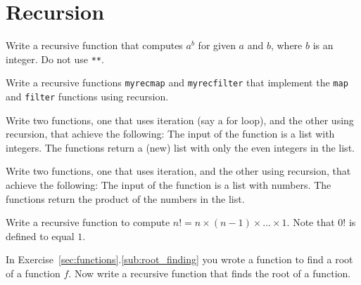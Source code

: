 \section{Recursion} %
\label{sec:recursion}

\begin{questions}
\label{sub:power}

Write a recursive function that computes $a^b$ for given $a$ and $b$, where
$b$ is an integer. Do not use \texttt{**}.


\label{sub:recursive_map}

Write a recursive functions \texttt{myrecmap} and \texttt{myrecfilter}
that implement the \texttt{map} and \texttt{filter} functions using recursion.


\label{sub:purify}

Write two functions, one that uses iteration (say a for loop), and the other using recursion, that achieve the following:
The input of the function is a list with integers. The functions return a (new) list with only the even integers in the list.

\label{sub:product}

Write two functions, one that uses iteration, and the other using recursion, that achieve the following:
The input of the function is a list with numbers. The functions return the product of the numbers in the list.


\label{sub:factorial}

Write a recursive function to compute $n! = n \times (n-1) \times \ldots \times 1$.
Note that $0!$ is defined to equal $1$.


\label{sub:rec_root_finding}

In Exercise~\ref{sec:functions}.\ref{sub:root_finding} you wrote a function to find a root of a function $f$.
Now write a recursive function that finds the root of a function.


\label{sub:collatz_sequence}


\end{questions}
